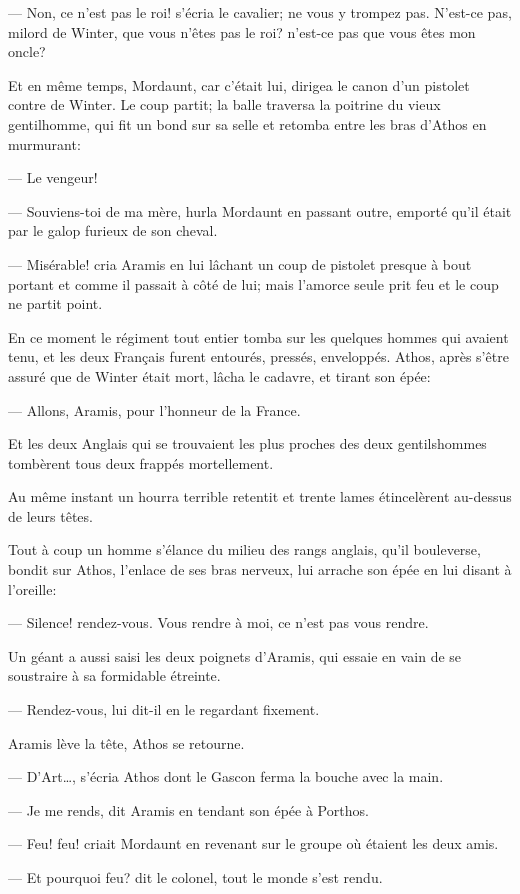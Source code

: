 — Non, ce n'est pas le roi! s'écria le cavalier; ne vous y trompez pas. N'est-ce pas, milord de Winter, que vous n'êtes pas le roi? n'est-ce pas que vous êtes mon oncle?

Et en même temps, Mordaunt, car c'était lui, dirigea le canon d'un pistolet contre de Winter. Le coup partit; la balle traversa la poitrine du vieux gentilhomme, qui fit un bond sur sa selle et retomba entre les bras d'Athos en murmurant:

— Le vengeur!

— Souviens-toi de ma mère, hurla Mordaunt en passant outre, emporté qu'il était par le galop furieux de son cheval.

— Misérable! cria Aramis en lui lâchant un coup de pistolet presque à bout portant et comme il passait à côté de lui; mais l'amorce seule prit feu et le coup ne partit point.

En ce moment le régiment tout entier tomba sur les quelques hommes qui avaient tenu, et les deux Français furent entourés, pressés, enveloppés. Athos, après s'être assuré que de Winter était mort, lâcha le cadavre, et tirant son épée:

— Allons, Aramis, pour l'honneur de la France.

Et les deux Anglais qui se trouvaient les plus proches des deux gentilshommes tombèrent tous deux frappés mortellement.

Au même instant un hourra terrible retentit et trente lames étincelèrent au-dessus de leurs têtes.

Tout à coup un homme s'élance du milieu des rangs anglais, qu'il bouleverse, bondit sur Athos, l'enlace de ses bras nerveux, lui arrache son épée en lui disant à l'oreille:

— Silence! rendez-vous. Vous rendre à moi, ce n'est pas vous rendre.

Un géant a aussi saisi les deux poignets d'Aramis, qui essaie en vain de se soustraire à sa formidable étreinte.

— Rendez-vous, lui dit-il en le regardant fixement.

Aramis lève la tête, Athos se retourne.

— D'Art\dots, s'écria Athos dont le Gascon ferma la bouche avec la main.

— Je me rends, dit Aramis en tendant son épée à Porthos.

— Feu! feu! criait Mordaunt en revenant sur le groupe où étaient les deux amis.

— Et pourquoi feu? dit le colonel, tout le monde s'est rendu.

